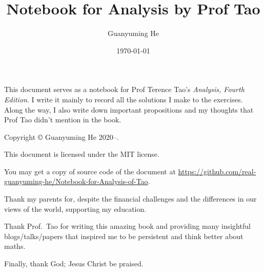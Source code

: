 \documentclass[oneside]{book}
\author{Guanyuming He}
\title{Notebook for Analysis by Prof Tao}
\date{\today}
\begin{document}
\pagestyle{empty}
\maketitle

This document serves as a notebook for Prof Terence Tao's \emph{Analysis, Fourth Edition}. I write it mainly to record all the solutions I make to the exercises. Along the way, I also write down important propositions and my thoughts that Prof Tao didn't mention in the book.

\vfill

\begin{center}
Copyright \copyright{} Guanyuming He 2020--\the\year{}. 

This document is licensed under the MIT license.

You may get a copy of source code of the document at 
\url{https://github.com/real-guanyuming-he/Notebook-for-Analysis-of-Tao}.
\end{center}

\newpage
Thank my parents for, despite the financial challenges and the differences in our views of the world, supporting my education.

Thank Prof.~Tao for writing this amazing book and providing many insightful blogs/talks/papers that inspired me to be persistent and think better about maths.

Finally, thank God; Jesus Christ be praised.

\newpage
\pagestyle{headings}


\newpage
\tableofcontents


\newpage
{}
\pagestyle{headings}



\newpage


\newpage
%

\newpage
%

\newpage
%

\newpage
%

\newpage
%

\newpage
%

\newpage
%

%

%


%
\end{document}
